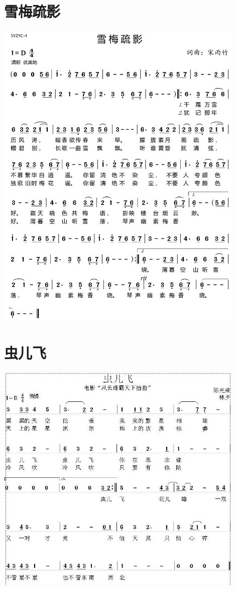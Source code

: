 \documentclass[cn,pad,twocol]{elegantbook}
\begin{document}
\section{雪梅疏影}              \includegraphics[width=0.9\textwidth]{dongxiao/20200725-雪梅疏影}
\section{虫儿飞} \includegraphics[width=0.9\textwidth]{macos/20210208虫儿飞.jpg}
\end{document}
